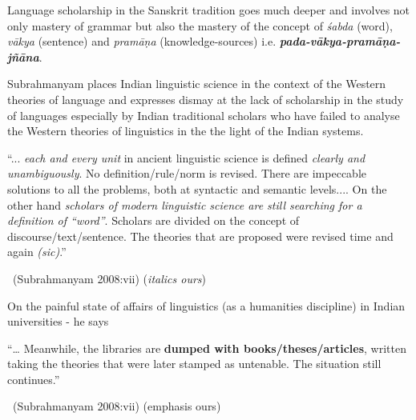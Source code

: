 Language scholarship in the Sanskrit tradition goes much deeper and involves not only mastery of grammar but also the mastery of the concept of \textit{śabda} (word), \textit{vākya} (sentence) and \textit{pramāṇa} (knowledge-sources) i.e. \textbf{\textit{pada-vākya-pramāṇa-jñāna}}.

Subrahmanyam places Indian linguistic science in the context of the Western theories of language and expresses dismay at the lack of scholarship in the study of languages especially by Indian traditional scholars who have failed to analyse the Western theories of linguistics in the the light of the Indian systems.

\begin{myquote}
“... \textit{each and every unit} in ancient linguistic science is defined \textit{clearly and unambiguously}. No definition/rule/norm is revised. There are impeccable solutions to all the problems, both at syntactic and semantic levels.... On the other hand \textit{scholars of modern linguistic science are still searching for a definition of “word”}. Scholars are divided on the concept of discourse/text/sentence. The theories that are proposed were revised time and again \textit{(sic)}.”

~\hfill (Subrahmanyam 2008:vii) (\textit{italics ours})
\end{myquote}

On the painful state of affairs of linguistics (as a humanities discipline) in Indian universities - he says

\begin{myquote}
“… Meanwhile, the libraries are \textbf{dumped with books/theses/articles}, written taking the theories that were later stamped as untenable. The situation still continues.”

~\hfill (Subrahmanyam 2008:vii) (emphasis ours)
\end{myquote}

